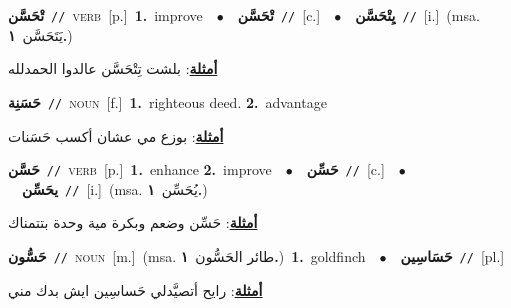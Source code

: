 \documentclass[10pt,a4paper,twoside]{article} %
\begin{document}
\begin{multicols}{2}
{\setlength\topsep{0pt}\textbf{\foreignlanguage{arabic}{تْحَسَّن}}\ {\color{gray}\texttt{//}\color{black}}\ \textsc{verb}\ [p.]\ \textbf{1.}~improve\ \ $\bullet$\ \ \setlength\topsep{0pt}\textbf{\foreignlanguage{arabic}{تْحَسَّن}}\ {\color{gray}\texttt{//}\color{black}}\ [c.]\ \ $\bullet$\ \ \setlength\topsep{0pt}\textbf{\foreignlanguage{arabic}{يِتْحَسَّن}}\ {\color{gray}\texttt{//}\color{black}}\ [i.]\ \color{gray}(msa. \foreignlanguage{arabic}{يَتَحَسَّن}~\foreignlanguage{arabic}{\textbf{١.}})\color{black}\  \begin{flushright}\color{gray}\foreignlanguage{arabic}{\textbf{\underline{\foreignlanguage{arabic}{أمثلة}}}: بلشت تِتْحَسَّن عالدوا الحمدلله}\end{flushright}\color{black}} \vspace{2mm}

{\setlength\topsep{0pt}\textbf{\foreignlanguage{arabic}{حَسَنِة}}\ {\color{gray}\texttt{//}\color{black}}\ \textsc{noun}\ [f.]\ \textbf{1.}~righteous deed.  \textbf{2.}~advantage\  \begin{flushright}\color{gray}\foreignlanguage{arabic}{\textbf{\underline{\foreignlanguage{arabic}{أمثلة}}}: بوزع مي عشان أكسب حَسَنات}\end{flushright}\color{black}} \vspace{2mm}

{\setlength\topsep{0pt}\textbf{\foreignlanguage{arabic}{حَسَّن}}\ {\color{gray}\texttt{//}\color{black}}\ \textsc{verb}\ [p.]\ \textbf{1.}~enhance  \textbf{2.}~improve\ \ $\bullet$\ \ \setlength\topsep{0pt}\textbf{\foreignlanguage{arabic}{حَسِّن}}\ {\color{gray}\texttt{//}\color{black}}\ [c.]\ \ $\bullet$\ \ \setlength\topsep{0pt}\textbf{\foreignlanguage{arabic}{يحَسِّن}}\ {\color{gray}\texttt{//}\color{black}}\ [i.]\ \color{gray}(msa. \foreignlanguage{arabic}{يُحَسِّن}~\foreignlanguage{arabic}{\textbf{١.}})\color{black}\  \begin{flushright}\color{gray}\foreignlanguage{arabic}{\textbf{\underline{\foreignlanguage{arabic}{أمثلة}}}: حَسِّن وضعم وبكرة مية وحدة بتتمناك}\end{flushright}\color{black}} \vspace{2mm}

{\setlength\topsep{0pt}\textbf{\foreignlanguage{arabic}{حَسُّون}}\ {\color{gray}\texttt{//}\color{black}}\ \textsc{noun}\ [m.]\ \color{gray}(msa. \foreignlanguage{arabic}{طائر الحَسُّون}~\foreignlanguage{arabic}{\textbf{١.}})\color{black}\ \textbf{1.}~goldfinch\ \ $\bullet$\ \ \setlength\topsep{0pt}\textbf{\foreignlanguage{arabic}{حَسَاسِين}}\ {\color{gray}\texttt{//}\color{black}}\ [pl.]\  \begin{flushright}\color{gray}\foreignlanguage{arabic}{\textbf{\underline{\foreignlanguage{arabic}{أمثلة}}}: رايح أتصيَّدلي حَساسِين ايش بدك مني}\end{flushright}\color{black}} \vspace{2mm}


\end{multicols}
\end{document}
